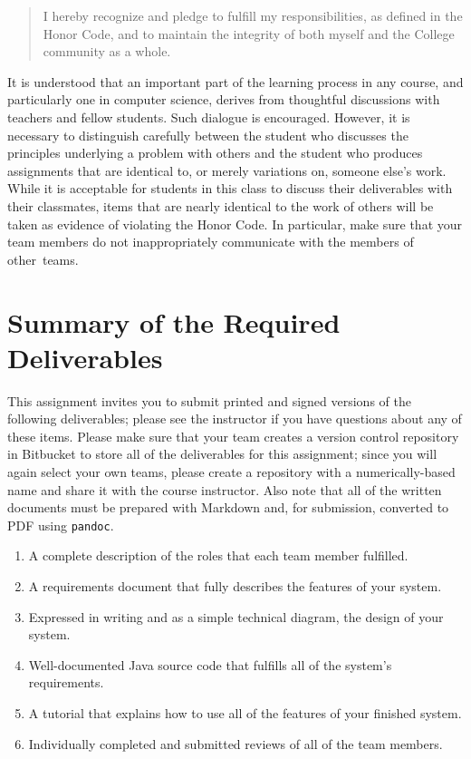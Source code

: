 \vspace*{-.05in}
\begin{quote}
  I hereby recognize and pledge to fulfill my responsibilities, as defined in the Honor Code, and to maintain the
  integrity of both myself and the College community as a whole.
\end{quote}
\vspace*{-.05in}

\noindent It is understood that an important part of the learning process in any course, and particularly one in
computer science, derives from thoughtful discussions with teachers and fellow students.  Such dialogue is encouraged.
However, it is necessary to distinguish carefully between the student who discusses the principles underlying a problem
with others and the student who produces assignments that are identical to, or merely variations on, someone else's
work.  While it is acceptable for students in this class to discuss their deliverables with their classmates, items that
are nearly identical to the work of others will be taken as evidence of violating the Honor Code. In particular, make
sure that your team members do not inappropriately communicate with the members of \mbox{other teams}.

\section*{Summary of the Required Deliverables}

This assignment invites you to submit printed and signed versions of the following deliverables; please see the
instructor if you have questions about any of these items. Please make sure that your team creates a version control
repository in Bitbucket to store all of the deliverables for this assignment; since you will again select your own
teams, please create a repository with a numerically-based name and share it with the course instructor. Also note that
all of the written documents must be prepared with Markdown and, for submission, converted to PDF using {\tt pandoc}.

\vspace*{-.1in}
\begin{enumerate}
  \setlength{\itemsep}{0in}
  \item A complete description of the roles that each team member fulfilled.
  \item A requirements document that fully describes the features of your system.
  \item Expressed in writing and as a simple technical diagram, the design of your system.
  \item Well-documented Java source code that fulfills all of the system's requirements.
  \item A tutorial that explains how to use all of the features of your finished system.
  \item Individually completed and submitted reviews of all of the team members.
\end{enumerate}
\vspace*{-.1in}


